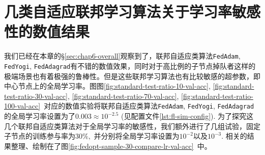 \section{几类自适应联邦学习算法关于学习率敏感性的数值结果}
\label{sec:chap6-lr}


我们已经在本章的\S\ref{sec:chap6-overall}观察到了，联邦自适应类算法\texttt{FedAdam}, \texttt{FedYogi}, \texttt{FedAdagrad}有不错的数值效果，同时对于高比例的子节点掉队者这样的极端场景也有着极强的鲁棒性。但是这些联邦学习算法也有比较敏感的超参数，即中心节点上的全局学习率。图图\ref{fig:standard-test-ratio-10-val-acc}, \ref{fig:standard-test-ratio-30-val-acc}, \ref{fig:standard-test-ratio-70-val-acc}, \ref{fig:standard-test-ratio-100-val-acc}~对应的数值实验将联邦自适应类算法\texttt{FedAdam}, \texttt{FedYogi}, \texttt{FedAdagrad}的全局学习率设置为了$0.003 \approx 10^{-2.5}$ (见配置文件\ref{lst:fl-sim-config}). 为了探究这几个联邦自适应类算法对于全局学习率的敏感性，我们额外进行了几组试验，固定子节点的训练参与率为$30\%,$ 并分别将全局学习率设置为$10^{-2}$以及$10^{-3}.$ 相关的结果整理、绘制在了图\ref{fig:fedopt-sample-30-compare-lr-val-acc}~中。

